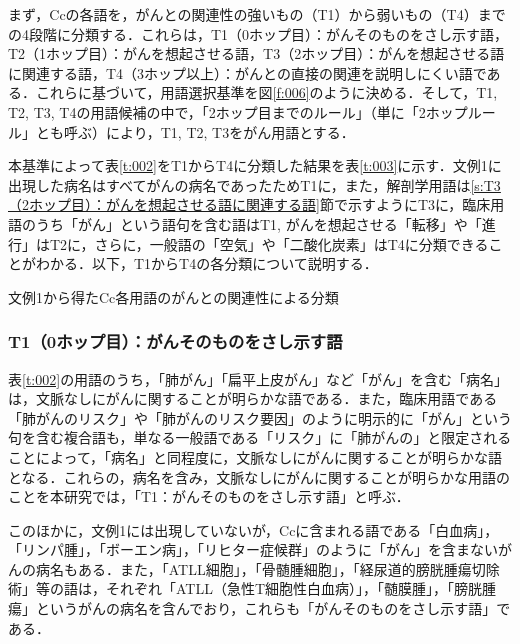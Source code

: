 \documentclass[japanese]{jnlp_1.4}
\begin{document}
まず，Ccの各語を，がんとの関連性の強いもの（T1）から弱いもの（T4）までの4段階に分類する．これらは，T1（0ホップ目）：がんそのものをさし示す語，T2（1ホップ目）：がんを想起させる語，T3（2ホップ目）：がんを想起させる語に関連する語，T4（3ホップ以上）：がんとの直接の関連を説明しにくい語である．これらに基づいて，用語選択基準を図\ref{f:006}のように決める．そして，T1, T2, T3, T4の用語候補の中で，「2ホップ目までのルール」（単に「2ホップルール」とも呼ぶ）により，T1, T2, T3をがん用語とする．

本基準によって表\ref{t:002}をT1からT4に分類した結果を表\ref{t:003}に示す．文例1に出現した病名はすべてがんの病名であったためT1に，また，解剖学用語は\ref{s:T3（2ホップ目）：がんを想起させる語に関連する語}節で示すようにT3に，臨床用語のうち「がん」という語句を含む語はT1, がんを想起させる「転移」や「進行」はT2に，さらに，一般語の「空気」や「二酸化炭素」はT4に分類できることがわかる．以下，T1からT4の各分類について説明する．

\begin{table}[b]
 \caption{文例1から得たCc各用語のがんとの関連性による分類}
 \begin{center}

 \end{center}
 \label{t:003}
\end{table}


\subsubsection{T1（0ホップ目）：がんそのものをさし示す語}
\label{s:T1（0ホップ目）：がんそのものをさし示す語}

表\ref{t:002}の用語のうち，「肺がん」「扁平上皮がん」など「がん」を含む「病名」は，文脈なしにがんに関することが明らかな語である．また，臨床用語である「肺がんのリスク」や「肺がんのリスク要因」のように明示的に「がん」という句を含む複合語も，単なる一般語である「リスク」に「肺がんの」と限定されることによって，「病名」と同程度に，文脈なしにがんに関することが明らかな語となる．これらの，病名を含み，文脈なしにがんに関することが明らかな用語のことを本研究では，「T1：がんそのものをさし示す語」と呼ぶ．

このほかに，文例1には出現していないが，Ccに含まれる語である「白血病」，「リンパ腫」，「ボーエン病」，「リヒター症候群」のように「がん」を含まないがんの病名もある．また，「ATLL細胞」，「骨髄腫細胞」，「経尿道的膀胱腫瘍切除術」等の語は，それぞれ「ATLL（急性T細胞性白血病）」，「髄膜腫」，「膀胱腫瘍」というがんの病名を含んでおり，これらも「がんそのものをさし示す語」である．
\end{document}
